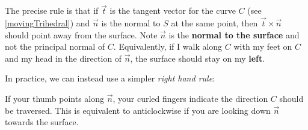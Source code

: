 \documentclass[../main.tex]{subfiles}
\begin{document}
The precise rule is that if $\vec{t}$ is the tangent vector for the curve $C$ (see \cref{movingTrihedral}) and $\vec{n}$ is the normal to $S$ at the same point, then $\vec{t} \times \vec{n}$ should point away from the surface.
Note $\vec{n}$ is the \textbf{normal to the surface} and not the principal normal of $C$.
Equivalently, if I walk along $C$ with my feet on $C$ and my head in the direction of $\vec{n}$, the surface should stay on my \textbf{left}.
\begin{remark}
  In practice, we can instead use a simpler \textit{right hand rule}:

  If your thumb points along $\vec{n}$, your curled fingers indicate the direction $C$ should be traversed.
  This is equivalent to anticlockwise if you are looking down $\vec{n}$ towards the surface.
\end{remark}
\end{document}
